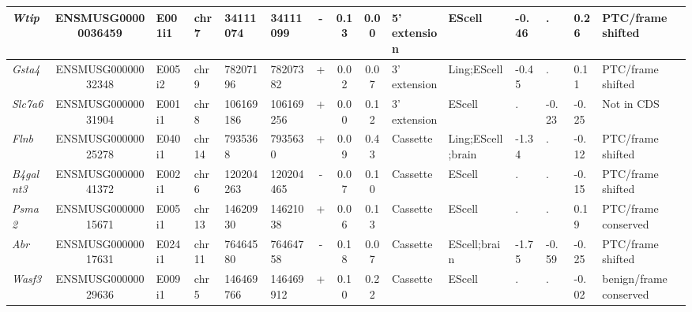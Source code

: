 \begin{appendices}
\begin{landscape}
\begin{table}[htbp]
{\begin{tabular}{|l|c|l|l|l|l|c|c|c|l|l|l|l|l|l|}
		\textit{Wtip} & ENSMUSG00000036459 & E001i1 & chr7  & 34111074 & 34111099 & -     & 0.13  & 0.00  & 5' extension & EScell & -0.46 & .     & 0.26  & PTC/frame shifted \\ \hline
		\textit{Gsta4} & ENSMUSG00000032348 & E005i2 & chr9  & 78207196 & 78207382 & +     & 0.02  & 0.07  & 3' extension & Ling;EScell & -0.45 & .     & 0.11  & PTC/frame shifted \\ \hline
		\textit{Slc7a6} & ENSMUSG00000031904 & E001i1 & chr8  & 106169186 & 106169256 & +     & 0.00  & 0.12  & 3' extension & EScell & .     & -0.23 & -0.25 & Not in CDS \\ \hline
		\textit{Flnb} & ENSMUSG00000025278 & E040i1 & chr14 & 7935368 & 7935630 & +     & 0.09  & 0.43  & Cassette & Ling;EScell;brain & -1.34 & .     & -0.12 & PTC/frame shifted \\ \hline
		\textit{B4galnt3} & ENSMUSG00000041372 & E002i1 & chr6  & 120204263 & 120204465 & -     & 0.07  & 0.10  & Cassette & EScell & .     & .     & -0.15 & PTC/frame shifted \\ \hline
		\textit{Psma2} & ENSMUSG00000015671 & E005i1 & chr13 & 14620930 & 14621038 & +     & 0.06  & 0.13  & Cassette & EScell & .     & .     & 0.19  & PTC/frame conserved \\ \hline
		\textit{Abr} & ENSMUSG00000017631 & E024i1 & chr11 & 76464580 & 76464758 & -     & 0.18  & 0.07  & Cassette & EScell;brain & -1.75 & -0.59 & -0.25 & PTC/frame shifted \\ \hline
		\textit{Wasf3} & ENSMUSG00000029636 & E009i1 & chr5  & 146469766 & 146469912 & +     & 0.10  & 0.22  & Cassette & EScell & .     & .     & -0.02 & benign/frame conserved \\ \hline
	\end{tabular}%
	}
\end{table}%

\clearpage


\end{landscape}
\end{appendices}
